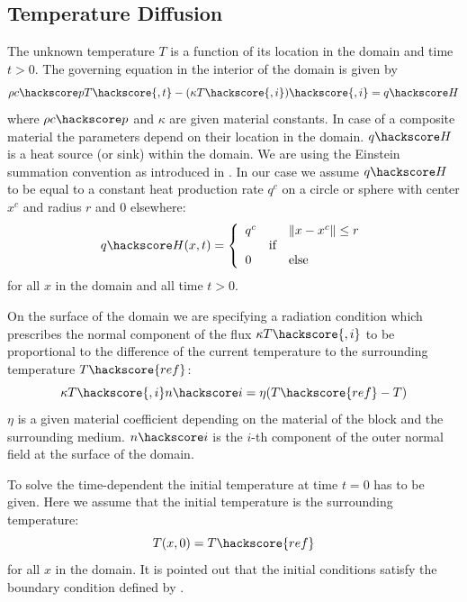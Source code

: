 \subsection{\label{DIFFUSION TEMP SEC}Temperature Diffusion}
The unknown temperature $T$ is a function of its location in the domain and time $t>0$. The governing equation
in the interior of the domain is given by
\begin{equation}
\rho c\hackscore p T\hackscore{,t} - (\kappa T\hackscore{,i})\hackscore{,i} = q\hackscore H
\label{DIFFUSION TEMP EQ 1}
\end{equation}
where $\rho c\hackscore p$ and $\kappa$ are given material constants. In case of a composite
material the parameters depend on their location in the domain. $q\hackscore H$ is
a heat source (or sink) within the domain. We are using the Einstein summation convention  
as introduced in . In our case we assume $q\hackscore H$ to be equal to a constant heat production rate 
$q^{c}$ on a circle or sphere with center $x^c$ and radius $r$ and $0$ elsewhere:
\begin{equation}
q\hackscore H(x,t)=
\left\{ 
\begin{array}{lcl}
q^c  & & \|x-x^c\| \le r \\
     & \mbox{if} \\
0    &  & \mbox{else} \\
\end{array}
\right.
\label{DIFFUSION TEMP EQ 1b}
\end{equation}
for all $x$ in the domain and all time  $t>0$.

On the surface of the domain we are 
specifying a radiation condition 
which prescribes the normal component of the flux $\kappa T\hackscore{,i}$ to be proportional
to the difference of the current temperature to the surrounding temperature $T\hackscore{ref}$:    
\begin{equation}
 \kappa T\hackscore{,i} n\hackscore i = \eta (T\hackscore{ref}-T) 
\label{DIFFUSION TEMP EQ 2}
\end{equation}
$\eta$ is a given material coefficient depending on the material of the block and the surrounding medium. 
$n\hackscore i$ is the $i$-th component of the outer normal field 
at the surface of the domain. 

To solve the time-dependent  the initial temperature at time 
$t=0$ has to be given. Here we assume that the initial temperature is the surrounding temperature:
\begin{equation}
T(x,0)=T\hackscore{ref} 
\label{DIFFUSION TEMP EQ 4}
\end{equation}
for all $x$ in the domain. It is pointed out that 
the initial conditions satisfy the 
boundary condition defined by . 

